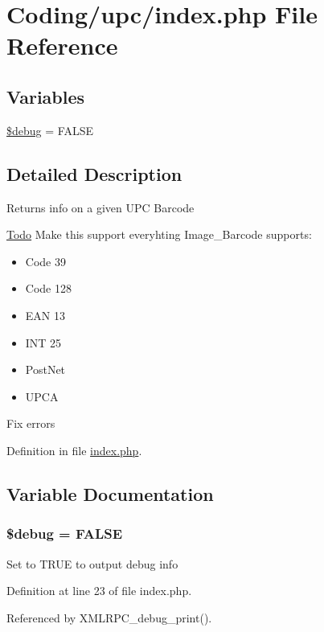\hypertarget{index_8php}{
\section{Coding/upc/index.php File Reference}
\label{index_8php}
}
\subsection*{Variables}
\begin{CompactItemize}
\item 
\hyperlink{index_8php_85ae3e64cd40e9564adceb010085e9dd}{\$debug} = FALSE
\end{CompactItemize}


\subsection{Detailed Description}
Returns info on a given UPC Barcode \begin{Desc}
\item[\hyperlink{todo__todo000001}{Todo}]Make this support everyhting Image\_\-Barcode supports:\begin{itemize}
\item Code 39\item Code 128\item EAN 13\item INT 25\item PostNet\item UPCA \end{itemize}


Fix errors \end{Desc}


Definition in file \hyperlink{index_8php-source}{index.php}.

\subsection{Variable Documentation}
\hypertarget{index_8php_85ae3e64cd40e9564adceb010085e9dd}{
\subsubsection{\setlength{\rightskip}{0pt plus 5cm}\$debug = FALSE}}
\label{index_8php_85ae3e64cd40e9564adceb010085e9dd}


Set to TRUE to output debug info 

Definition at line 23 of file index.php.

Referenced by XMLRPC\_\-debug\_\-print().